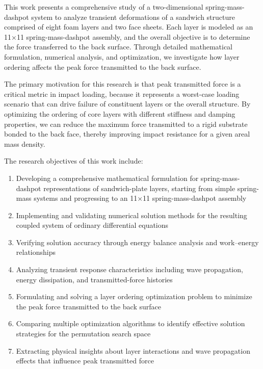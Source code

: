\documentclass[11pt,a4paper]{article}
\begin{document}
\noindent This work presents a comprehensive study of a two-dimensional spring-mass-dashpot system to analyze transient deformations of a sandwich structure comprised of eight foam layers and two face sheets. Each layer is modeled as an 11×11 spring-mass-dashpot assembly, and the overall objective is to determine the force transferred to the back surface. Through detailed mathematical formulation, numerical analysis, and optimization, we investigate how layer ordering affects the peak force transmitted to the back surface. \newline

\noindent The primary motivation for this research is that peak transmitted force is a critical metric in impact loading, because it represents a worst-case loading scenario that can drive failure of constituent layers or the overall structure. By optimizing the ordering of core layers with different stiffness and damping properties, we can reduce the maximum force transmitted to a rigid substrate bonded to the back face, thereby improving impact resistance for a given areal mass density. \newline

\noindent The research objectives of this work include:
\begin{enumerate}
    \item Developing a comprehensive mathematical formulation for spring-mass-dashpot representations of sandwich-plate layers, starting from simple spring-mass systems and progressing to an 11×11 spring-mass-dashpot assembly
    \item Implementing and validating numerical solution methods for the resulting coupled system of ordinary differential equations
    \item Verifying solution accuracy through energy balance analysis and work--energy relationships
    \item Analyzing transient response characteristics including wave propagation, energy dissipation, and transmitted-force histories
    \item Formulating and solving a layer ordering optimization problem to minimize the peak force transmitted to the back surface
    \item Comparing multiple optimization algorithms to identify effective solution strategies for the permutation search space
    \item Extracting physical insights about layer interactions and wave propagation effects that influence peak transmitted force
\end{enumerate}
\end{document}
